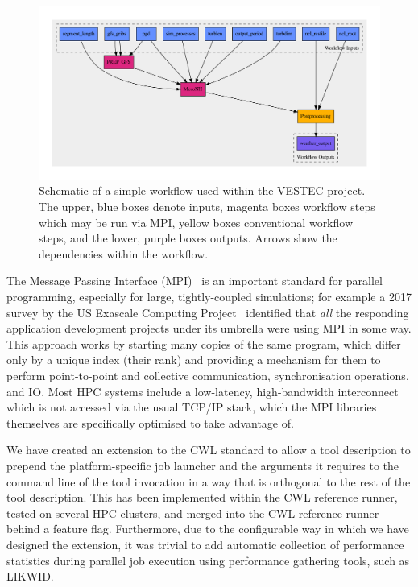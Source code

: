 \documentclass[conference]{IEEEtran}
\begin{document}
\begin{figure}[!tb]
    \centering
    \includegraphics[width=\textwidth]{mnh.pdf}
    \caption{Schematic of a simple workflow used within the VESTEC project. The upper, blue boxes denote inputs, magenta boxes workflow steps which may be run via MPI, yellow boxes conventional workflow steps, and the lower, purple boxes outputs. Arrows show the dependencies within the workflow.}
    \label{fig:mnh-wf}
\end{figure}

The Message Passing Interface (MPI)~\cite{MPI31} is an important standard for parallel programming, especially for large, tightly-coupled simulations; for example a 2017 survey by the US Exascale Computing Project~\cite{ecpsurvey} identified that \emph{all} the responding application development projects under its umbrella were using MPI in some way. This approach works by starting many copies of the same program, which differ only by a unique index (their rank) and providing a mechanism for them to perform point-to-point and collective communication, synchronisation operations, and  IO. Most HPC systems include a low-latency, high-bandwidth interconnect which is not accessed via the usual TCP/IP stack, which the MPI libraries themselves are specifically optimised to take advantage of. 

We have created an extension to the CWL standard to allow a tool description to prepend the platform-specific job launcher and the arguments it requires to the command line of the tool invocation in a way that is orthogonal to the rest of the tool description. This has been implemented within the CWL reference runner, tested on several HPC clusters, and merged into the CWL reference runner behind a feature flag. Furthermore, due to the configurable way in which we have designed the extension, it was trivial to add automatic collection of performance statistics during parallel job execution using performance gathering tools, such as LIKWID\cite{likwid_paper}.
\end{document}
